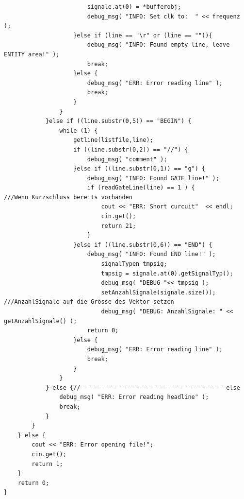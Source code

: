 \documentclass[a4paper,10pt,twoside]{report}
\begin{document}
\begin{lstlisting}
                        signale.at(0) = *bufferobj;
                        debug_msg( "INFO: Set clk to:  " << frequenz );
                    }else if (line == "\r" or (line == "")){
                        debug_msg( "INFO: Found empty line, leave ENTITY area!" );
                        break;
                    }else {
                        debug_msg( "ERR: Error reading line" );
                        break;
                    }
                }
            }else if ((line.substr(0,5)) == "BEGIN") {
                while (1) {
                    getline(listfile,line);
                    if ((line.substr(0,2)) == "//") {
                        debug_msg( "comment" );
                    }else if ((line.substr(0,1)) == "g") {
                        debug_msg( "INFO: Found GATE line!" );
                        if (readGateLine(line) == 1 ) {                                          ///Wenn Kurzschluss bereits vorhanden
                            cout << "ERR: Short curcuit"  << endl;
                            cin.get();
                            return 21;
                        }
                    }else if ((line.substr(0,6)) == "END") {
                        debug_msg( "INFO: Found END line!" );
                            signalTypen tmpsig;
                            tmpsig = signale.at(0).getSignalTyp();
                            debug_msg( "DEBUG "<< tmpsig );
                            setAnzahlSignale(signale.size());                                       ///AnzahlSignale auf die Grösse des Vektor setzen
                            debug_msg( "DEBUG: AnzahlSignale: " << getAnzahlSignale() );
                        return 0;
                    }else {
                        debug_msg( "ERR: Error reading line" );
                        break;
                    }
                }
            } else {//------------------------------------------else
                debug_msg( "ERR: Error reading headline" );
                break;
            }
        }
    } else {
        cout << "ERR: Error opening file!";
        cin.get();
        return 1;
    }
    return 0;
}


\end{lstlisting}
\end{document}
